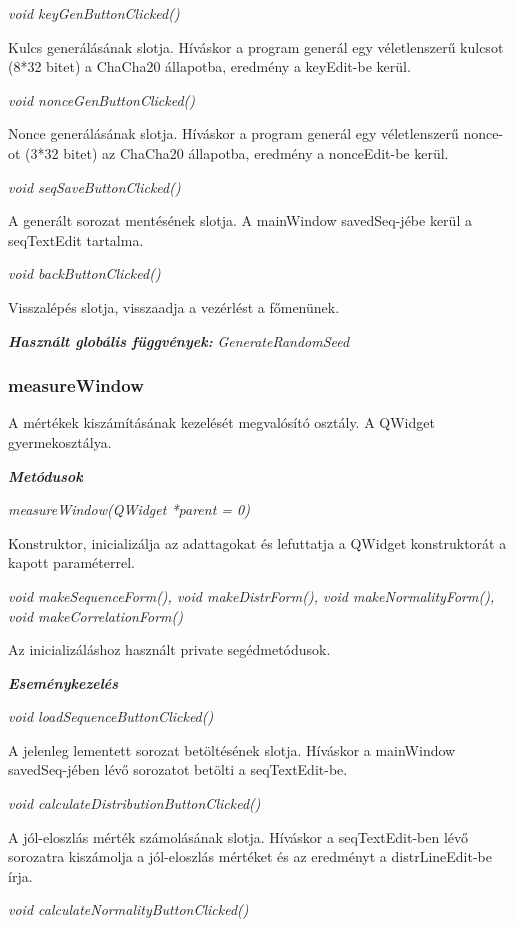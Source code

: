 \documentclass[hidelinks, 12pt]{article}
\begin{document}
\textit{void keyGenButtonClicked()}

Kulcs generálásának slotja. Híváskor a program generál egy véletlenszerű kulcsot (8*32 bitet) a ChaCha20 állapotba, eredmény a keyEdit-be kerül.

\textit{void nonceGenButtonClicked()}

Nonce generálásának slotja. Híváskor a program generál egy véletlenszerű nonce-ot (3*32 bitet) az ChaCha20 állapotba, eredmény a nonceEdit-be kerül.

\textit{void seqSaveButtonClicked()}

A generált sorozat mentésének slotja. A mainWindow savedSeq-jébe kerül a seqTextEdit tartalma.

\textit{void backButtonClicked()}

Visszalépés slotja, visszaadja a vezérlést a főmenünek.

\textit{\textbf{Használt globális függvények: }}\textit{GenerateRandomSeed}

\subsubsection*{measureWindow}

A mértékek kiszámításának kezelését megvalósító osztály. A QWidget gyermekosztálya.

\textit{\textbf{Metódusok}}

\textit{measureWindow(QWidget *parent = 0)}

Konstruktor, inicializálja az adattagokat és lefuttatja a QWidget konstruktorát a kapott paraméterrel.

\textit{void makeSequenceForm(), void makeDistrForm(), void makeNormalityForm(), void makeCorrelationForm()}

Az inicializáláshoz használt private segédmetódusok.

\textit{\textbf{Eseménykezelés}}

\textit{void loadSequenceButtonClicked()}

A jelenleg lementett sorozat betöltésének slotja. Híváskor a mainWindow savedSeq-jében lévő sorozatot betölti a seqTextEdit-be.

\textit{void calculateDistributionButtonClicked()}

A jól-eloszlás mérték számolásának slotja. Híváskor a seqTextEdit-ben lévő sorozatra kiszámolja a jól-eloszlás mértéket és az eredményt a distrLineEdit-be írja.

\textit{void calculateNormalityButtonClicked()}
\end{document}
